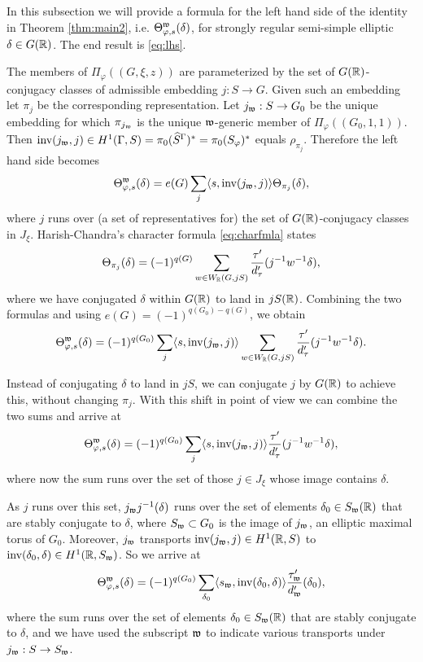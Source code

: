 \documentclass{article}
\theoremstyle{definition}
\numberwithin{equation}{section}
\renewcommand{\-}{\hyp{}}
\begin{document}
In this subsection we will provide a formula for the left hand side of the identity in Theorem \ref{thm:main2}, i.e. $\Theta^{\mathfrak{w}}_{\varphi,s}(\delta)$, for strongly regular semi-simple elliptic $\delta \in G(\mathbb{R})$. The end result is \eqref{eq:lhs}.

The members of $\Pi_\varphi((G,\xi,z))$ are parameterized by the set of $G(\mathbb{R})$-conjugacy classes of admissible embedding $j : S \to G$. Given such an embedding let $\pi_j$ be the corresponding representation. Let $j_{\mathfrak{w}} : S \to G_0$ be the unique embedding for which $\pi_{j_{\mathfrak{w}}}$ is the unique $\mathfrak{w}$-generic member of $\Pi_\varphi((G_0,1,1))$. Then $\textrm{inv}(j_{\mathfrak{w}},j) \in H^1(\Gamma,S)=\pi_0(\widehat S^\Gamma)^*=\pi_0(S_\varphi)^*$ equals $\rho_{\pi_j}$. Therefore the left hand side becomes
\[ \Theta^{\mathfrak{w}}_{\varphi,s}(\delta)=e(G)\sum_j \langle s,\textrm{inv}(j_{\mathfrak{w}},j)\rangle\Theta_{\pi_j}(\delta), \]
where $j$ runs over (a set of representatives for) the set of $G(\mathbb{R})$-conjugacy classes in $J_\xi$. Harish-Chandra's character formula \eqref{eq:charfmla} states
\[ \Theta_{\pi_j}(\delta) = (-1)^{q(G)}\sum_{w \in W_{\mathbb{R}}(G,jS)}\frac{\tau'}{d_\tau'}(j^{-1}w^{-1}\delta),\]
where we have conjugated $\delta$ within $G(\mathbb{R})$ to land in $jS(\mathbb{R})$. Combining the two formulas and using $e(G)=(-1)^{q(G_0)-q(G)}$, we obtain
\[ \Theta^{\mathfrak{w}}_{\varphi,s}(\delta) = (-1)^{q(G_0)} \sum_j \langle s,\textrm{inv}(j_{\mathfrak{w}},j)\rangle \sum_{w \in W_{\mathbb{R}}(G,jS)}\frac{\tau'}{d_\tau'}(j^{-1}w^{-1}\delta). \]

Instead of conjugating $\delta$ to land in $jS$, we can conjugate $j$ by $G(\mathbb{R})$ to achieve this, without changing $\pi_j$. With this shift in point of view we can combine the two sums and arrive at
\[ \Theta^{\mathfrak{w}}_{\varphi,s}(\delta) = (-1)^{q(G_0)} \sum_j \langle s,\textrm{inv}(j_{\mathfrak{w}},j)\rangle \frac{\tau'}{d_\tau'}(j^{-1}w^{-1}\delta), \]
where now the sum runs over the set of those $j \in J_\xi$ whose image contains $\delta$.

As $j$ runs over this set, $j_{\mathfrak{w}}j^{-1}(\delta)$ runs over the set of elements $\delta_0 \in S_{\mathfrak{w}}(\mathbb{R})$ that are stably conjugate to $\delta$, where $S_{\mathfrak{w}} \subset G_0$ is the image of $j_{\mathfrak{w}}$, an elliptic maximal torus of $G_0$. Moreover, $j_{\mathfrak{w}}$ transports $\textrm{inv}(j_{\mathfrak{w}},j) \in H^1(\mathbb{R},S)$ to $\textrm{inv}(\delta_0,\delta) \in H^1(\mathbb{R},S_{\mathfrak{w}})$. So we arrive at
\begin{equation} \label{eq:lhs}
\Theta^{\mathfrak{w}}_{\varphi,s}(\delta) = (-1)^{q(G_0)} \sum_{\delta_0} \langle s_{\mathfrak{w}},\textrm{inv}(\delta_0,\delta)\rangle \frac{\tau_{\mathfrak{w}}'}{d_{\mathfrak{w}}'}(\delta_0),
\end{equation}
where the sum runs over the set of elements $\delta_0 \in S_{\mathfrak{w}}(\mathbb{R})$ that are stably conjugate to $\delta$, and we have used the subscript $\mathfrak{w}$ to indicate various transports under $j_{\mathfrak{w}} : S \to S_{\mathfrak{w}}$.
\end{document}

